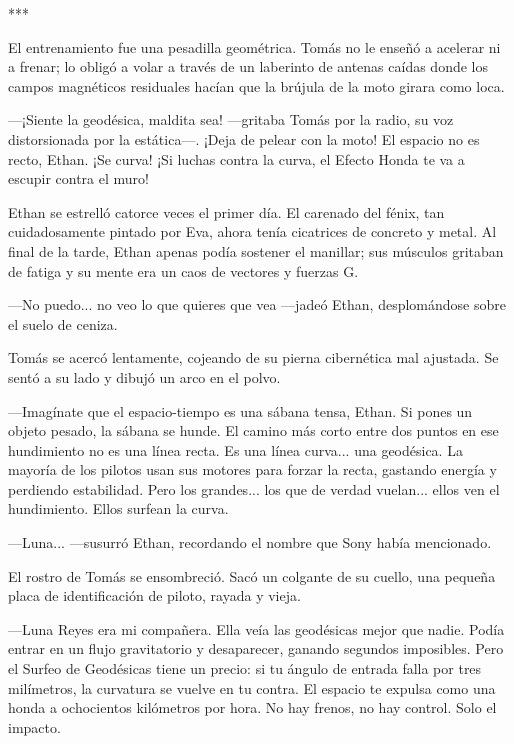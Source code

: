 \documentclass[11pt,twoside]{book}
\begin{document}
\bigskip
\begin{center}***\end{center}
\bigskip

El entrenamiento fue una pesadilla geométrica. Tomás no le enseñó a acelerar ni a frenar; lo obligó a volar a través de un laberinto de antenas caídas donde los campos magnéticos residuales hacían que la brújula de la moto girara como loca.

---¡Siente la geodésica, maldita sea! ---gritaba Tomás por la radio, su voz distorsionada por la estática---. ¡Deja de pelear con la moto! El espacio no es recto, Ethan. ¡Se curva! ¡Si luchas contra la curva, el Efecto Honda te va a escupir contra el muro!

Ethan se estrelló catorce veces el primer día. El carenado del fénix, tan cuidadosamente pintado por Eva, ahora tenía cicatrices de concreto y metal. Al final de la tarde, Ethan apenas podía sostener el manillar; sus músculos gritaban de fatiga y su mente era un caos de vectores y fuerzas G.

---No puedo... no veo lo que quieres que vea ---jadeó Ethan, desplomándose sobre el suelo de ceniza.

Tomás se acercó lentamente, cojeando de su pierna cibernética mal ajustada. Se sentó a su lado y dibujó un arco en el polvo.

---Imagínate que el espacio-tiempo es una sábana tensa, Ethan. Si pones un objeto pesado, la sábana se hunde. El camino más corto entre dos puntos en ese hundimiento no es una línea recta. Es una línea curva... una geodésica. La mayoría de los pilotos usan sus motores para forzar la recta, gastando energía y perdiendo estabilidad. Pero los grandes... los que de verdad vuelan... ellos ven el hundimiento. Ellos surfean la curva.

---Luna... ---susurró Ethan, recordando el nombre que Sony había mencionado.

El rostro de Tomás se ensombreció. Sacó un colgante de su cuello, una pequeña placa de identificación de piloto, rayada y vieja.

---Luna Reyes era mi compañera. Ella veía las geodésicas mejor que nadie. Podía entrar en un flujo gravitatorio y desaparecer, ganando segundos imposibles. Pero el Surfeo de Geodésicas tiene un precio: si tu ángulo de entrada falla por tres milímetros, la curvatura se vuelve en tu contra. El espacio te expulsa como una honda a ochocientos kilómetros por hora. No hay frenos, no hay control. Solo el impacto.
\end{document}
